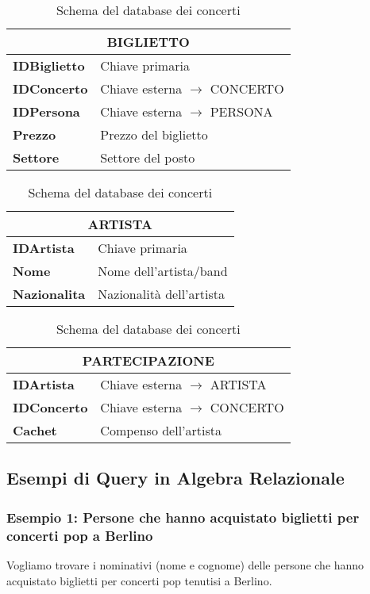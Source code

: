 \begin{table}[htbp]
	\begin{tabular}{|l|l|}
		\hline
		\multicolumn{2}{|c|}{\textbf{BIGLIETTO}} \\
		\hline
		\textbf{IDBiglietto} & Chiave primaria \\
		\textbf{IDConcerto} & Chiave esterna $\rightarrow$ CONCERTO \\
		\textbf{IDPersona} & Chiave esterna $\rightarrow$ PERSONA \\
		\textbf{Prezzo} & Prezzo del biglietto \\
		\textbf{Settore} & Settore del posto \\
		\hline
	\end{tabular}
	\hspace{1cm}
	\begin{tabular}{|l|l|}
		\hline
		\multicolumn{2}{|c|}{\textbf{ARTISTA}} \\
		\hline
		\textbf{IDArtista} & Chiave primaria \\
		\textbf{Nome} & Nome dell'artista/band \\
		\textbf{Nazionalita} & Nazionalità dell'artista \\
		\hline
	\end{tabular}
	
	\vspace{0.5cm}
	
	\begin{tabular}{|l|l|}
		\hline
		\multicolumn{2}{|c|}{\textbf{PARTECIPAZIONE}} \\
		\hline
		\textbf{IDArtista} & Chiave esterna $\rightarrow$ ARTISTA \\
		\textbf{IDConcerto} & Chiave esterna $\rightarrow$ CONCERTO \\
		\textbf{Cachet} & Compenso dell'artista \\
		\hline
	\end{tabular}
	\caption{Schema del database dei concerti}
\end{table}

\subsection{Esempi di Query in Algebra Relazionale}

\subsubsection{Esempio 1: Persone che hanno acquistato biglietti per concerti pop a Berlino}

\noindent Vogliamo trovare i nominativi (nome e cognome) delle persone che hanno acquistato biglietti per concerti pop tenutisi a Berlino.

